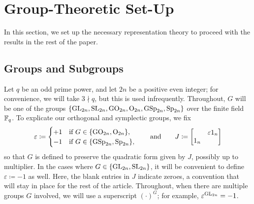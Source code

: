 
\section{Group-Theoretic Set-Up} \label{sec:rep-theory}
In this section, we set up the necessary representation theory to proceed with the results in the rest of the paper.

\subsection{Groups and Subgroups}
Let $q$ be an odd prime power, and let $2n$ be a positive even integer; for convenience, we will take $3\nmid q$, but this is used infrequently. Throughout, $G$ will be one of the groups $\{{\mathrm{GL}}_{2n},{\mathrm{SL}}_{2n},\mathrm{GO}_{2n},\mathrm{O}_{2n},\mathrm{GSp}_{2n},\mathrm{Sp}_{2n}\}$ over the finite field $\mathbb F_q$. To explicate our orthogonal and symplectic groups, we fix
\[\varepsilon\coloneqq\begin{cases}
    +1 & \text{if }G\in\{\mathrm{GO}_{2n},\mathrm{O}_{2n}\}, \\
    -1 & \text{if }G\in\{\mathrm{GSp}_{2n},\mathrm{Sp}_{2n}\},
\end{cases}\qquad\text{and}\qquad J\coloneqq\begin{bmatrix}
    & \varepsilon1_n \\
    1_n
\end{bmatrix}\]
so that $G$ is defined to preserve the quadratic form given by $J$, possibly up to multiplier. In the cases where $G\in\{\mathrm{GL}_{2n},\mathrm{SL}_{2n}\}$, it will be convenient to define $\varepsilon\coloneqq-1$ as well. Here, the blank entries in $J$ indicate zeroes, a convention that will stay in place for the rest of the article. Throughout, when there are multiple groups $G$ involved, we will use a superscript $(\cdot)^G$; for example, $\varepsilon^{\mathrm{GL}_{2n}}=-1$.

